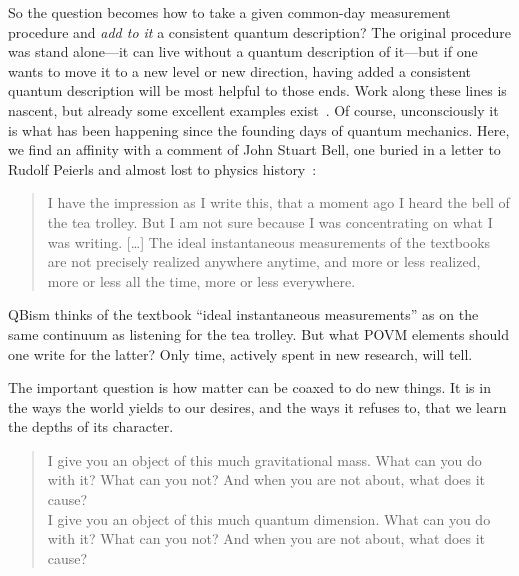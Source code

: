 \documentclass[aps,pra,superscriptaddress,12pt,tightenlines,nofootinbib]{revtex4-2}
\begin{document}
So the question becomes how to take a given common-day measurement procedure and {\it add to it\/} a consistent quantum description?  The original procedure was stand alone---it can live without a quantum description of it---but if one wants to move it to a new level or new direction, having added a consistent quantum description will be most helpful to those ends.  Work along these lines is nascent, but already some excellent examples exist~\cite{Kofler08}.  Of course, unconsciously it is what has been happening since the founding days of quantum mechanics.  Here, we find an affinity with a comment of John Stuart Bell, one buried in a letter to Rudolf Peierls and almost lost to physics history~\cite{Mermin14}:
\begin{quote}
 \noindent I have the impression as I write this, that a moment ago I heard the
bell of the tea trolley. But I am not sure because I was concentrating
on what I was writing. [\ldots\!] The ideal instantaneous measurements of the
textbooks are not precisely realized anywhere anytime, and more or less
realized, more or less all the time, more or less everywhere.
\end{quote}
QBism thinks of the textbook ``ideal instantaneous measurements'' as on the same continuum as listening for the tea trolley.  But what POVM elements should one write for the latter?  Only time, actively spent in new research, will tell.

The important question is how matter can be coaxed to do new things.  It is in the ways the world yields to our desires, and the ways it refuses to, that we learn the depths of its character.
\begin{verse}
I give you an object of this much gravitational mass.  What can you do with it?  What can you not?  And when you are not about, what does it cause?
\\
I give you an object of this much quantum dim\-ension.  What can you do with it?  What can you not?  And when you are not about, what does it cause?
\end{verse}
\end{document}
